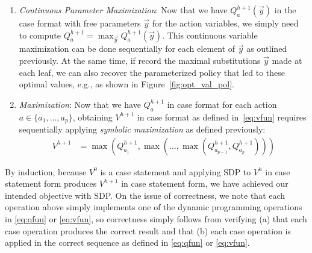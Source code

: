 \begin{enumerate}
\item {\it Continuous Parameter Maximization}: Now that we have
$Q_a^{h+1}(\vec{y})$ in the case format with free parameters $\vec{y}$
for the action variables, we simply need to compute $Q_a^{h+1} =
\max_{\vec{y}} Q_a^{h+1}(\vec{y})$.  This continuous variable
maximization can be done sequentially for each element of $\vec{y}$ as
outlined previously.  At the same time, if record the maximal
substitutions $\vec{y}$ made at each leaf, we can also recover
the parameterized policy that led to these optimal values, e.g.,
as shown in Figure~\ref{fig:opt_val_pol}.

\item {\it Maximization}: Now that we have $Q_a^{h+1}$ in
case format for each action $a \in \{a_1,\ldots,a_p\}$, obtaining
$V^{h+1}$ in case format as defined in~\eqref{eq:vfun} requires
sequentially applying
\emph{symbolic maximization} as defined previously:
\begin{align*}
V^{h+1} & = 
\max(Q_{a_1}^{h+1},\max(\ldots,\max(Q_{a_{p-1}}^{h+1},Q_{a_p}^{h+1})))
\end{align*}
\end{enumerate}
By induction, because $V^0$ is a case statement and applying
SDP to $V^h$ in case statement form produces $V^{h+1}$ in case
statement form, we have achieved our intended
objective with SDP.  On the issue of correctness,
we note that each operation above simply implements one of the
dynamic programming operations in \eqref{eq:qfun} or \eqref{eq:vfun}, 
so correctness simply follows from verifying (a) that each case
operation produces the correct result and that (b) each case operation
is applied in the correct sequence as defined in \eqref{eq:qfun} or 
\eqref{eq:vfun}.  
